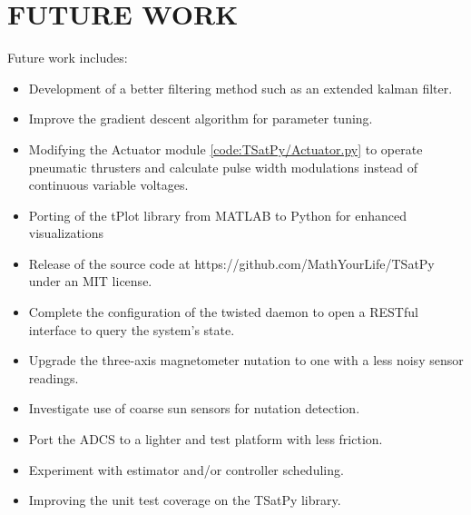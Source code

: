 \section{FUTURE WORK}
\label{chap:FutureWork}


Future work includes:

\begin{itemize}
\item Development of a better filtering method such as an extended kalman filter.
\item Improve the gradient descent algorithm for parameter tuning.
\item Modifying the Actuator module \ref{code:TSatPy/Actuator.py} to operate pneumatic thrusters and calculate pulse width modulations instead of continuous variable voltages.
\item Porting of the tPlot library from MATLAB to Python for enhanced visualizations
\item Release of the source code at https://github.com/MathYourLife/TSatPy under an MIT license.
\item Complete the configuration of the twisted daemon to open a RESTful interface to query the system's state.
\item Upgrade the three-axis magnetometer nutation to one with a less noisy sensor readings.
\item Investigate use of coarse sun sensors for nutation detection.
\item Port the ADCS to a lighter and test platform with less friction.
\item Experiment with estimator and/or controller scheduling.
\item Improving the unit test coverage on the TSatPy library.
\end{itemize}

